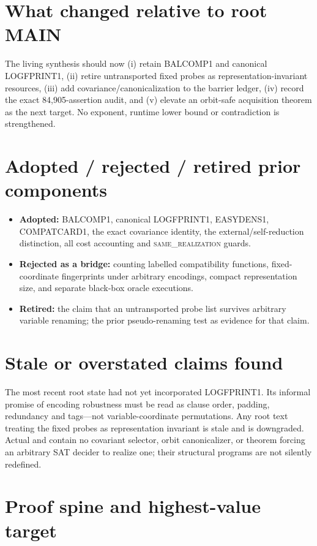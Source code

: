\documentclass[11pt]{article}
\newcommand{\same}{\textsc{same\_realization}}
\begin{document}
\section{What changed relative to root MAIN}

The living synthesis should now (i) retain BALCOMP1 and canonical LOGFPRINT1,
(ii) retire untransported fixed probes as representation-invariant resources,
(iii) add covariance/canonicalization to the barrier ledger, (iv) record the exact
84,905-assertion audit, and (v) elevate an orbit-safe acquisition theorem as the next
target.  No exponent, runtime lower bound or contradiction is strengthened.

\section{Adopted / rejected / retired prior components}

\begin{itemize}
\item \textbf{Adopted:} BALCOMP1, canonical LOGFPRINT1, EASYDENS1, COMPATCARD1, the exact
covariance identity, the external/self-reduction distinction, all cost accounting and
\same{} guards.
\item \textbf{Rejected as a bridge:} counting labelled compatibility functions,
fixed-coordinate fingerprints under arbitrary encodings, compact representation size,
and separate black-box oracle executions.
\item \textbf{Retired:} the claim that an untransported probe list survives arbitrary
variable renaming; the prior pseudo-renaming test as evidence for that claim.
\end{itemize}

\section{Stale or overstated claims found}

The most recent root state had not yet incorporated LOGFPRINT1.  Its informal promise of
encoding robustness must be read as clause order, padding, redundancy and tags---not
variable-coordinate permutations.  Any root text treating the fixed probes as
representation invariant is stale and is downgraded.  Actual  and
 contain no covariant selector, orbit canonicalizer, or theorem forcing
an arbitrary SAT decider to realize one; their structural programs are not silently
redefined.

\section{Proof spine and highest-value target}
\end{document}
